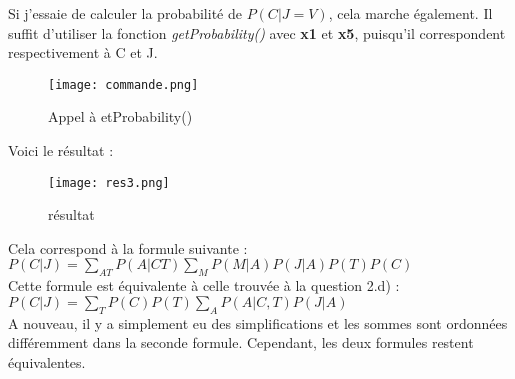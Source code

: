 \documentclass[12pt]{article}
\begin{document}
Si j'essaie de calculer la probabilité de $P(C|J=V)$, cela marche également. 
Il suffit d'utiliser la fonction \textit{getProbability()} avec \textbf{x1} et \textbf{x5}, puisqu'il correspondent respectivement à C et J.
\begin{figure}[H]
\begin{center}
  \texttt{[image: commande.png]}
  \caption{Appel à etProbability()}
\end{center}
\end{figure}
Voici le résultat : 
\begin{figure}[H]
\begin{center}
  \texttt{[image: res3.png]}
  \caption{résultat}
\end{center}
\end{figure}
Cela correspond à la formule suivante : \\ 
$P(C|J) = \sum_{A T} P(A|C T) \sum_{M} P(M|A) P(J|A) P(T) P(C) $ \\
Cette formule est équivalente à celle trouvée à la question 2.d) : \\
$P(C|J) = \sum_{T} P(C) P(T) \sum_{A} P(A|C, T) P(J|A)$ \\
A nouveau, il y a simplement eu des simplifications et les sommes sont ordonnées différemment dans la seconde formule. Cependant, les deux formules restent équivalentes.
\\ \linebreak




%


%
\end{document}
